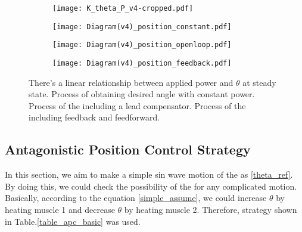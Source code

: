 \begin{figure}[t]
	\centering
	\begin{minipage}{0.30\textwidth}
		\begin{subfigure}{\linewidth}
			\centering
			\texttt{[image: K\_theta\_P\_v4-cropped.pdf]}
			\caption{\label{KthetaP}}
		\end{subfigure}
	\end{minipage}%
	\begin{minipage}{0.6\textwidth}
		\centering
		\begin{subfigure}{0.55\linewidth}
			\centering
			\texttt{[image: Diagram(v4)\_position\_constant.pdf]}
			\caption{\label{AntaControl_constant}}
		\end{subfigure}
		
		\begin{subfigure}{0.73\linewidth}
			\centering
			\texttt{[image: Diagram(v4)\_position\_openloop.pdf]}
			\caption{\label{position_open_loop}}
		\end{subfigure}
		
		\begin{subfigure}{\linewidth}
			\centering
			\texttt{[image: Diagram(v4)\_position\_feedback.pdf]}
			\caption{\label{position_closed_loop}}
		\end{subfigure}
	\end{minipage}
	\caption[Block diagrams for the \apc]{ There's a linear relationship between applied power and $\theta$ at steady state.  Process of obtaining desired angle with constant power.  Process of the \apc including a lead compensator.  Process of the \apc including feedback and feedforward.}
	\label{anta_position_diagrams}
\end{figure}


\subsection{Antagonistic Position Control Strategy}
In this section, we aim to make a simple sin wave motion of the \anta as \eqref{theta_ref}. By doing this, we could check the possibility of the \apc for any complicated motion. Basically, according to the equation \eqref{simple_assume}, we could increase $\theta$ by heating muscle 1 and decrease $\theta$ by heating muscle 2. Therefore, strategy shown in Table.\ref{table_apc_basic} was used.

